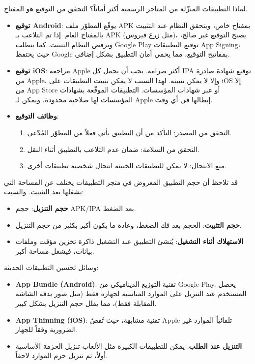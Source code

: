
لماذا التطبيقات المنزّلة من المتاجر الرسمية أكثر أماناً؟ التحقق من التوقيع هو المفتاح.

\begin{itemize}
  \item \textbf{توقيع Android}: يوقّع المطوّر ملف APK بمفتاح خاص، ويتحقق النظام عند التثبيت بالمفتاح العام. إذا تم التلاعب بـ APK (مثل زرع فيروس)، يصبح التوقيع غير صالح، ويرفض النظام التثبيت. كما يتطلب Google Play توقيع التطبيقات App Signing، حيث يحتفظ Google بمفاتيح التوقيع، مما يحمي أمان التطبيق بشكل إضافي.
  \item \textbf{توقيع iOS}: مراجعة Apple أكثر صرامة. يجب أن يحمل كل IPA توقيع شهادة صادرة من Apple، وإلا لا يمكن تثبيته. لهذا السبب لا يمكن تثبيت التطبيقات على iOS إلا من App Store أو عبر شهادات المؤسسات. التطبيقات الموقّعة بشهادات المؤسسات لها صلاحية محدودة، ويمكن لـ Apple إبطالها في أي وقت.
  \item \textbf{وظائف التوقيع}:
  \begin{enumerate}
    \item التحقق من المصدر: التأكد من أن التطبيق يأتي فعلاً من المطوّر المُدّعى.
    \item التحقق من السلامة: ضمان عدم التلاعب بالتطبيق أثناء النقل.
    \item منع الانتحال: لا يمكن للتطبيقات الخبيثة انتحال شخصية تطبيقات أخرى.
  \end{enumerate}
\end{itemize}


قد تلاحظ أن حجم التطبيق المعروض في متجر التطبيقات يختلف عن المساحة التي يشغلها بعد التثبيت. والسبب:

\begin{itemize}
  \item \textbf{حجم التنزيل}: حجم APK/IPA بعد الضغط.
  \item \textbf{حجم التثبيت}: الحجم بعد فك الضغط، وعادة ما يكون أكبر بكثير من حجم التنزيل.
  \item \textbf{الاستهلاك أثناء التشغيل}: يُنشئ التطبيق عند التشغيل ذاكرة تخزين مؤقت وملفات بيانات، فيشغل مساحة أكبر.
\end{itemize}

وسائل تحسين التطبيقات الحديثة:

\begin{itemize}
  \item \textbf{App Bundle (Android)}: تقنية التوزيع الديناميكي من Google Play. يحصل المستخدم عند التنزيل على الموارد المناسبة لجهازه فقط (مثل صور بدقة الشاشة المقابلة فقط)، مما يقلل حجم التنزيل بشكل كبير.
  \item \textbf{App Thinning (iOS)}: تقنية مشابهة، حيث تُقصّ Apple تلقائياً الموارد غير الضرورية وفقاً للجهاز.
  \item \textbf{التنزيل عند الطلب}: يمكن للتطبيقات الكبيرة مثل الألعاب تنزيل الحزمة الأساسية أولاً، ثم تنزيل حزم الموارد لاحقاً.
\end{itemize}

